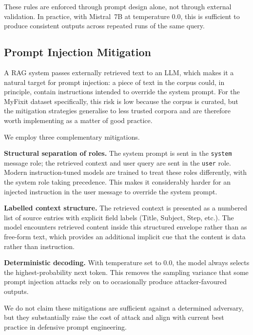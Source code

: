 \documentclass[journal,onecolumn]{IEEEtran}
\begin{document}
These rules are enforced through prompt design alone, not through external
validation. In practice, with Mistral~7B at temperature 0.0, this is
sufficient to produce consistent outputs across repeated runs of the same
query.

\subsection{Prompt Injection Mitigation}

A RAG system passes externally retrieved text to an LLM, which makes it a
natural target for prompt injection: a piece of text in the corpus could,
in principle, contain instructions intended to override the system prompt.
For the MyFixit dataset specifically, this risk is low because the corpus is
curated, but the mitigation strategies generalise to less trusted corpora
and are therefore worth implementing as a matter of good practice.

We employ three complementary mitigations.

\textbf{Structural separation of roles.} The system prompt is sent in the
\texttt{system} message role; the retrieved context and user query are sent
in the \texttt{user} role. Modern instruction-tuned models are trained to
treat these roles differently, with the system role taking precedence. This
makes it considerably harder for an injected instruction in the user message
to override the system prompt.

\textbf{Labelled context structure.} The retrieved context is presented as
a numbered list of source entries with explicit field labels (Title, Subject,
Step, etc.). The model encounters retrieved content inside this structured
envelope rather than as free-form text, which provides an additional implicit
cue that the content is data rather than instruction.

\textbf{Deterministic decoding.} With temperature set to 0.0, the model
always selects the highest-probability next token. This removes the sampling
variance that some prompt injection attacks rely on to occasionally produce
attacker-favoured outputs.

We do not claim these mitigations are sufficient against a determined
adversary, but they substantially raise the cost of attack and align with
current best practice in defensive prompt engineering.

\end{document}
